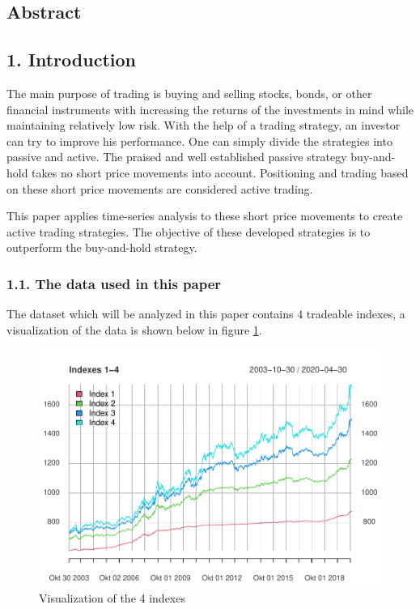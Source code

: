 \documentclass[
]{article}
\author{}
\date{\vspace{-2.5em}}
\begin{document}




\tableofcontents

\newpage

\hypertarget{abstract}{%
\subsection{Abstract}\label{abstract}}

\newpage


\hypertarget{introduction}{%
\subsection{1. Introduction}\label{introduction}}

The main purpose of trading is buying and selling stocks, bonds, or
other financial instruments with increasing the returns of the
investments in mind while maintaining relatively low risk. With the help
of a trading strategy, an investor can try to improve his performance.
One can simply divide the strategies into passive and active. The
praised and well established passive strategy buy-and-hold takes no
short price movements into account. Positioning and trading based on
these short price movements are considered active trading.

This paper applies time-series analysis to these short price movements
to create active trading strategies. The objective of these developed
strategies is to outperform the buy-and-hold strategy.

\hypertarget{the-data-used-in-this-paper}{%
\subsubsection{1.1. The data used in this
paper}\label{the-data-used-in-this-paper}}

The dataset which will be analyzed in this paper contains 4 tradeable
indexes, a visualization of the data is shown below in figure
\ref{fig:chap1.1}.

\begin{figure}

{\centering \includegraphics[width=0.7\linewidth]{00_main_files/figure-latex/chap1.1-1} 

}

\caption{Visualization of the 4 indexes}\label{fig:chap1.1}
\end{figure}
\end{document}
